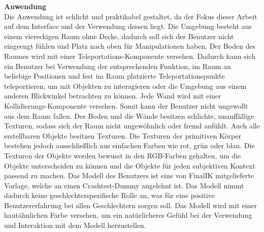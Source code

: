 \noindent \textbf{Anwendung}\\
Die Anwendung ist schlicht und praktikabel gestaltet, da der Fokus dieser Arbeit auf dem Interface und der Verwendung dessen liegt. Die Umgebung besteht aus einem viereckigen Raum ohne Decke, dadurch soll sich der Benutzer nicht eingeengt fühlen und Platz nach oben für Manipulationen haben. Der Boden des Raumes wird mit einer Teleportations-Komponente versehen. Dadurch kann sich ein Benutzer bei Verwendung der entsprechenden Funktion, im Raum an beliebige Positionen und fest im Raum platzierte Teleportationspunkte teleportieren, um mit Objekten zu interagieren oder die Umgebung aus einem anderen Blickwinkel betrachten zu können. Jede Wand wird mit einer Kollidierungs-Komponente versehen. Somit kann der Benutzer nicht ungewollt aus dem Raum fallen. Der Boden und die Wände besitzen schlichte, unauffällige Texturen, sodass sich der Raum nicht ungewöhnlich oder fremd anfühlt. Auch alle erstellbaren Objekte besitzen Texturen. Die Texturen der primitiven Körper bestehen jedoch ausschließlich aus einfachen Farben wie rot, grün oder blau. Die Texturen der Objekte werden bewusst in den RGB-Farben gehalten, um die Objekte unterscheiden zu können und die Objekte für jeden subjektiven Kontext passend zu machen. Das Modell des Benutzers ist eine von FinalIK mitgelieferte Vorlage, welche an einen Crashtest-Dummy angelehnt ist. Das Modell nimmt dadurch keine geschlechterspezifische Rolle an, was für eine positive Benutzererfahrung bei allen Geschlechtern sorgen soll. Das Modell wird mit einer hautähnlichen Farbe versehen, um ein natürlicheres Gefühl bei der Verwendung und Interaktion mit dem Modell herzustellen.\\

